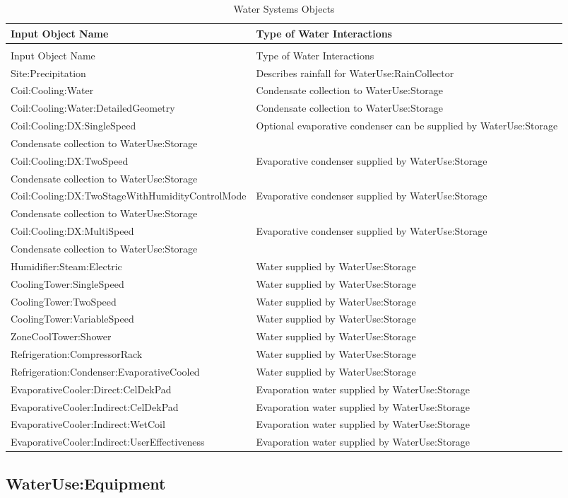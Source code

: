 \begin{longtable}[c]{p{3.5in}p{3.5in}}
\caption{Water Systems Objects \label{table:water-systems-objects}} \tabularnewline
\toprule
Input Object Name & Type of Water Interactions \tabularnewline
\midrule
\endfirsthead

\caption[]{Water Systems Objects} \tabularnewline
\toprule
Input Object Name & Type of Water Interactions \tabularnewline
\midrule
\endhead

Site:Precipitation & Describes rainfall for WaterUse:RainCollector \tabularnewline
Coil:Cooling:Water & Condensate collection to WaterUse:Storage \tabularnewline
Coil:Cooling:Water:DetailedGeometry & Condensate collection to WaterUse:Storage \tabularnewline
Coil:Cooling:DX:SingleSpeed & Optional evaporative condenser can be supplied by WaterUse:Storage \tabularnewline
Condensate collection to WaterUse:Storage \tabularnewline
Coil:Cooling:DX:TwoSpeed & Evaporative condenser supplied by WaterUse:Storage \tabularnewline
Condensate collection to WaterUse:Storage \tabularnewline
Coil:Cooling:DX:TwoStageWithHumidityControlMode & Evaporative condenser supplied by WaterUse:Storage \tabularnewline
Condensate collection to WaterUse:Storage \tabularnewline
Coil:Cooling:DX:MultiSpeed & Evaporative condenser supplied by WaterUse:Storage \tabularnewline
Condensate collection to WaterUse:Storage \tabularnewline
Humidifier:Steam:Electric & Water supplied by WaterUse:Storage \tabularnewline
CoolingTower:SingleSpeed & Water supplied by WaterUse:Storage \tabularnewline
CoolingTower:TwoSpeed & Water supplied by WaterUse:Storage \tabularnewline
CoolingTower:VariableSpeed & Water supplied by WaterUse:Storage \tabularnewline
ZoneCoolTower:Shower & Water supplied by WaterUse:Storage \tabularnewline
Refrigeration:CompressorRack & Water supplied by WaterUse:Storage \tabularnewline
Refrigeration:Condenser:EvaporativeCooled & Water supplied by WaterUse:Storage \tabularnewline
EvaporativeCooler:Direct:CelDekPad & Evaporation water supplied by WaterUse:Storage \tabularnewline
EvaporativeCooler:Indirect:CelDekPad & Evaporation water supplied by WaterUse:Storage \tabularnewline
EvaporativeCooler:Indirect:WetCoil & Evaporation water supplied by WaterUse:Storage \tabularnewline
EvaporativeCooler:Indirect:UserEffectiveness & Evaporation water supplied by WaterUse:Storage \tabularnewline
\bottomrule
\end{longtable}

\subsection{WaterUse:Equipment}\label{wateruseequipment}

